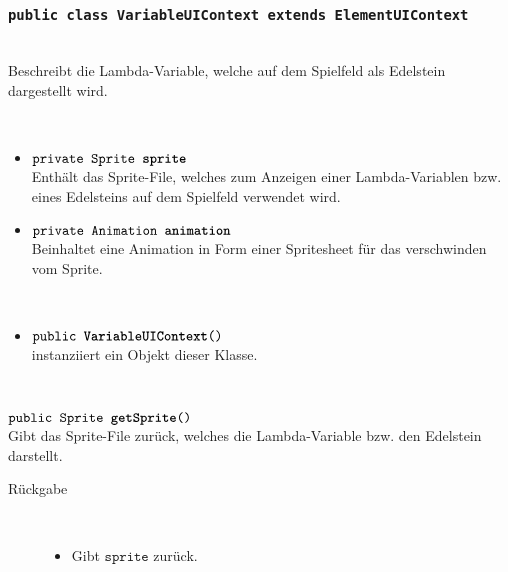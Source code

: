 \begin{description}
			
			
	\end{description}	

		\subsubsection{\normalfont \texttt{public class \textbf{VariableUIContext} extends ElementUIContext}}

\begin{description}
\item[Beschreibung] \hfill \\ Beschreibt die Lambda-Variable, welche auf dem Spielfeld als Edelstein dargestellt wird.
\item[Attribute] \hfill \\
	\vspace{-.8cm}
	\begin{itemize}	
		\item $\texttt{private Sprite \textbf{sprite}}$ \\ Enthält das Sprite-File, welches zum Anzeigen einer Lambda-Variablen bzw. eines Edelsteins auf dem Spielfeld verwendet wird.
		\item $\texttt{private Animation \textbf{animation}}$ \\ Beinhaltet eine Animation in Form einer Spritesheet für das verschwinden vom Sprite.
		\end{itemize}
	
\item[Konstruktoren] \hfill \\
	\vspace{-.8cm}
	\begin{itemize}
		\item $\texttt{public \textbf{VariableUIContext}()}$ \\ instanziiert ein Objekt dieser Klasse.

	\end{itemize}
	
\item[Methoden] \hfill \\
	\vspace{-.8cm}
		\item $\texttt{public Sprite \textbf{getSprite}()}$ \\ Gibt das Sprite-File zurück, welches die Lambda-Variable bzw. den Edelstein darstellt.
		\begin{description}
			\item[Rückgabe] \hfill \\
			\vspace{-.8cm}
			\begin{itemize}
				\item Gibt $\texttt{sprite}$ zurück.
			\end{itemize}
			\end{description}
			

\end{description}
